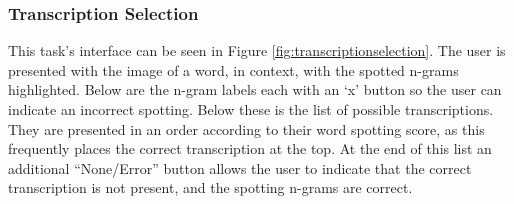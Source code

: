 \documentclass[ms,electronic,twosidetoc,letterpaper,chaptercenter,parttop,lof,lot]{byumsphd}
\begin{document}

\subsubsection{Transcription Selection}\label{transtask}
This task's interface can be seen in Figure \ref{fig:transcriptionselection}.
The user is presented with the image of a word, in context, with the spotted n-grams highlighted. Below are the n-gram labels each with an `x' button so the user can indicate an incorrect spotting.
Below these is the list of possible transcriptions. They are presented in an order according to their word spotting score, as this frequently places the correct transcription at the top.
At the end of this list an additional ``None/Error'' button allows the user to indicate that the correct transcription is not present, and the spotting n-grams are correct.
\end{document}
